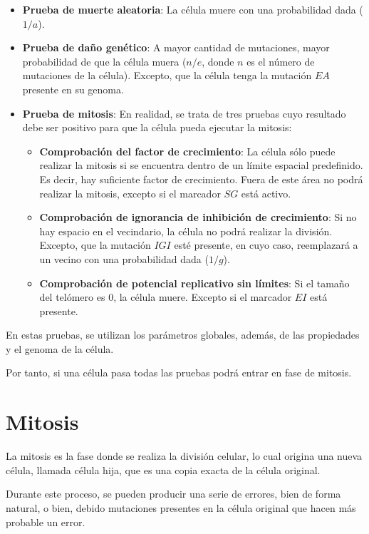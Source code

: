 \begin{itemize}
    \item \textbf{Prueba de muerte aleatoria}: La célula muere con una probabilidad dada ($1/a$).
    \item \textbf{Prueba de daño genético}: A mayor cantidad de mutaciones, mayor probabilidad de
    que la célula muera ($n/e$, donde $n$ es el número de mutaciones de la célula). Excepto, que
    la célula tenga la mutación $EA$ presente en su genoma.
    \item \textbf{Prueba de mitosis}: En realidad, se trata de tres pruebas cuyo resultado debe
    ser positivo para que la célula pueda ejecutar la mitosis:
    \begin{itemize}
        \item \textbf{Comprobación del factor de crecimiento}: La célula sólo puede realizar la
        mitosis si se encuentra dentro de un límite espacial predefinido. Es decir, hay suficiente
        factor de crecimiento. Fuera de este área no podrá realizar la mitosis, excepto si el
        marcador $SG$ está activo.
        \item \textbf{Comprobación de ignorancia de inhibición de crecimiento}: Si no hay
        espacio en el vecindario, la célula no podrá realizar la división. Excepto, que
        la mutación $IGI$ esté presente, en cuyo caso, reemplazará a un vecino con una
        probabilidad dada ($1/g$).
        \item \textbf{Comprobación de potencial replicativo sin límites}: Si el tamaño del telómero
        es $0$, la célula muere. Excepto si el marcador $EI$ está presente.
    \end{itemize}
\end{itemize}

En estas pruebas, se utilizan los parámetros globales, además, de las propiedades y el genoma de la célula.

Por tanto, si una célula pasa todas las pruebas podrá entrar en fase de mitosis.

\section{Mitosis}

La mitosis es la fase donde se realiza la división celular, lo cual origina una nueva célula, llamada
célula hija, que es una copia exacta de la célula original.

Durante este proceso, se pueden producir una serie de errores, bien de forma natural, o bien, debido
mutaciones presentes en la célula original que hacen más probable un error.

